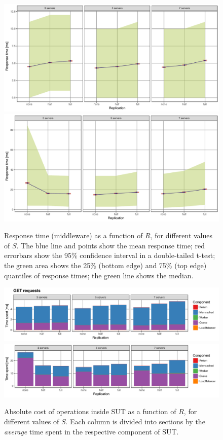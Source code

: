 \documentclass[11pt]{article}
\begin{document}
\begin{figure}[h]
\centering
\includegraphics[width=\textwidth]{../results/replication/graphs/response_time_vs_replication_get.pdf}
\includegraphics[width=\textwidth]{../results/replication/graphs/response_time_vs_replication_set.pdf}
\caption{Response time (middleware) as a function of $R$, for different values of $S$. The blue line and points show the mean response time; red errorbars show the 95\% confidence interval in a double-tailed t-test; the green area shows the 25\% (bottom edge) and 75\% (top edge) quantiles of response times; the green line shows the median.}
\label{fig:exp2:res:replication}
\end{figure}

\begin{figure}[h]
\centering
\includegraphics[width=\textwidth]{../results/replication/graphs/time_breakdown_vs_replication_get_abs.pdf}
\includegraphics[width=\textwidth]{../results/replication/graphs/time_breakdown_vs_replication_set_abs.pdf}
\caption{Absolute cost of operations inside SUT as a function of $R$, for different values of $S$. Each column is divided into sections by the \emph{average} time spent in the respective component of SUT.}
\label{fig:exp2:res:breakdown}
\end{figure}
\end{document}
